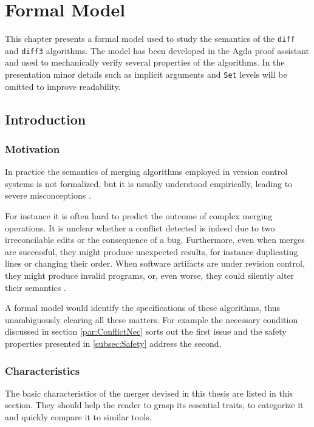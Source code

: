 \documentclass[../Thesis.tex]{subfiles}
\begin{document}
\chapter{Formal Model}
\label{chapter:FormalModel}
This chapter presents a formal model used to study the semantics of the \texttt{diff} and \texttt{diff3} algorithms.
The model has been developed in the Agda proof assistant
\cite{Bove09, NorellPhd, Norell08} and used to mechanically 
verify several properties of the algorithms.
In the presentation minor details such as implicit arguments and \texttt{Set} levels will be omitted to improve readability. 	

\section{Introduction}

	\subsection{Motivation}
	In practice the semantics of merging algorithms employed in version control 
	systems is not formalized, but it is usually understood empirically,
	leading to severe misconceptions \cite{PierceDiff3}.
	
	For instance it is often hard to predict the outcome of complex merging 	
	operations.
	It is unclear whether a conflict detected is indeed due to two irreconcilable 
	edits or the consequence of a bug. 
	Furthermore, even when merges are successful, they might produce 
	unexpected	results, for instance duplicating lines or changing their order.
	When software artifacts are under revision control, they might produce 
	invalid programs, or, even worse, they could silently alter 
	their semantics \cite{Mens02}.

	A formal model would identify the specifications of these algorithms,
	thus unambiguously clearing all these matters.
	For example the necessary condition discussed in section 
	\ref{par:ConflictNec} sorts out the first issue and the safety
	properties presented in \ref{subsec:Safety} address the second.

	\subsection{Characteristics}
	The basic characteristics of the merger devised in this thesis
	are listed in this section. They should help the reader to grasp
	its essential traits, to categorize it and quickly compare it to similar tools.
	
\end{document}
